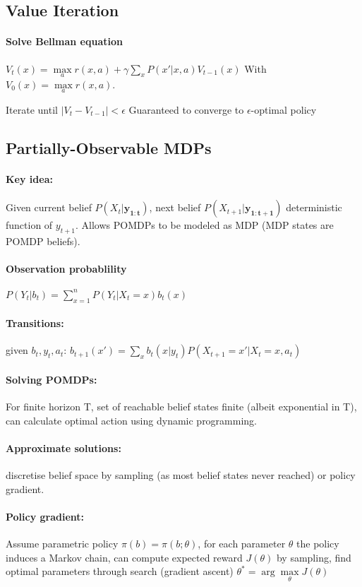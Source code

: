 \begin{multicols}{4}
\subsection{Value Iteration}
\paragraph{Solve Bellman equation} $V_t(x) = \max\limits_a r(x,a) + \gamma \sum\limits_{x}P(x'|x,a)V_{t-1}(x)$
With $V_0(x) = \max\limits_a r(x,a)$.

Iterate until $|V_t - V_{t-1}| < \epsilon$
Guaranteed to converge to $\epsilon$-optimal policy

\subsection{Partially-Observable MDPs}
\paragraph{Key idea:} Given current belief $P(X_t|\bm{y_{1:t}})$, next belief $P(X_{t+1}|\bm{y_{1:t+1}})$ deterministic function of $y_{t+1}$. Allows POMDPs to be modeled as MDP (MDP states are POMDP beliefs).
\paragraph{Observation probablility} $P(Y_t|b_t) = \sum\limits_{x=1}^nP(Y_t | X_t = x)b_t(x)$
\paragraph{Transitions:} given $b_t, y_t, a_t$: $b_{t+1}(x') = \sum\limits_x b_t(x|y_t)P(X_{t+1} = x' | X_t = x,a_t)$
\paragraph{Solving POMDPs:} For finite horizon T, set of reachable belief states finite (albeit exponential in T), can calculate optimal action using dynamic programming.
\paragraph{Approximate solutions:} discretise belief space by sampling (as most belief states never reached) or policy gradient.
\paragraph{Policy gradient:} Assume parametric policy $\pi(b) = \pi(b;\theta)$, for each parameter $\theta$ the policy induces a Markov chain, can compute expected reward $J(\theta)$ by sampling, find optimal parameters through search (gradient ascent) $\theta^* = \arg\max\limits_{\theta} J(\theta)$


\end{multicols}
